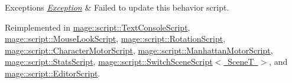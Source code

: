 \begin{DoxyExceptions}{Exceptions}
{\em \mbox{\hyperlink{classmage_1_1_exception}{Exception}}} & Failed to update this behavior script. \\
\hline
\end{DoxyExceptions}


Reimplemented in \mbox{\hyperlink{classmage_1_1script_1_1_text_console_script_ad619f93a946660b30f5e39821778f7b0}{mage\+::script\+::\+Text\+Console\+Script}}, \mbox{\hyperlink{classmage_1_1script_1_1_mouse_look_script_a3b78aebd104b061f5d176843ef58a48a}{mage\+::script\+::\+Mouse\+Look\+Script}}, \mbox{\hyperlink{classmage_1_1script_1_1_rotation_script_af4e83590b78094186b0dd107a58c7b3a}{mage\+::script\+::\+Rotation\+Script}}, \mbox{\hyperlink{classmage_1_1script_1_1_character_motor_script_ae738c9550e17be133291ccd2a6681368}{mage\+::script\+::\+Character\+Motor\+Script}}, \mbox{\hyperlink{classmage_1_1script_1_1_manhattan_motor_script_af1ee420e1378bf930cce1ce92a37d640}{mage\+::script\+::\+Manhattan\+Motor\+Script}}, \mbox{\hyperlink{classmage_1_1script_1_1_stats_script_aad8c3b8fb846d47605b1f1d14f1ea157}{mage\+::script\+::\+Stats\+Script}}, \mbox{\hyperlink{classmage_1_1script_1_1_switch_scene_script_a04b60ff2b34f490012e4115ae1e788d7}{mage\+::script\+::\+Switch\+Scene\+Script$<$ Scene\+T $>$}}, and \mbox{\hyperlink{classmage_1_1script_1_1_editor_script_a311532d499edfaf3f74aa598fb87ec8e}{mage\+::script\+::\+Editor\+Script}}.

